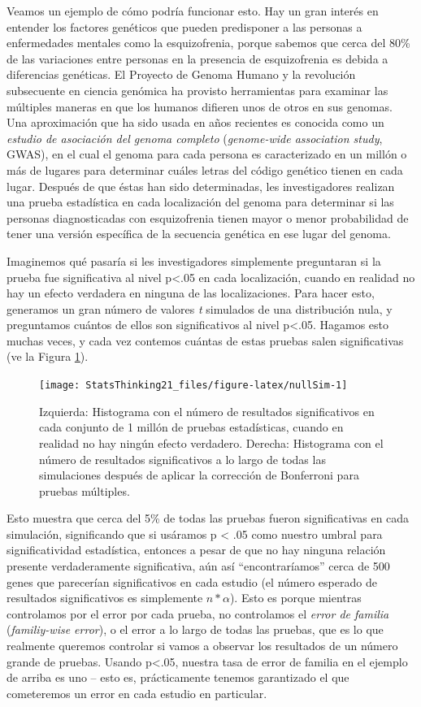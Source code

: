 \documentclass[
  12pt,
]{book}
\theoremstyle{definition}
\theoremstyle{definition}
\theoremstyle{definition}
\theoremstyle{remark}
\begin{document}
Veamos un ejemplo de cómo podría funcionar esto. Hay un gran interés en entender los factores genéticos que pueden predisponer a las personas a enfermedades mentales como la esquizofrenia, porque sabemos que cerca del 80\% de las variaciones entre personas en la presencia de esquizofrenia es debida a diferencias genéticas. El Proyecto de Genoma Humano y la revolución subsecuente en ciencia genómica ha provisto herramientas para examinar las múltiples maneras en que los humanos difieren unos de otros en sus genomas. Una aproximación que ha sido usada en años recientes es conocida como un \emph{estudio de asociación del genoma completo} (\emph{genome-wide association study}, GWAS), en el cual el genoma para cada persona es caracterizado en un millón o más de lugares para determinar cuáles letras del código genético tienen en cada lugar. Después de que éstas han sido determinadas, les investigadores realizan una prueba estadística en cada localización del genoma para determinar si las personas diagnosticadas con esquizofrenia tienen mayor o menor probabilidad de tener una versión específica de la secuencia genética en ese lugar del genoma.

Imaginemos qué pasaría si les investigadores simplemente preguntaran si la prueba fue significativa al nivel p\textless.05 en cada localización, cuando en realidad no hay un efecto verdadera en ninguna de las localizaciones. Para hacer esto, generamos un gran número de valores \emph{t} simulados de una distribución nula, y preguntamos cuántos de ellos son significativos al nivel p\textless.05. Hagamos esto muchas veces, y cada vez contemos cuántas de estas pruebas salen significativas (ve la Figura \ref{fig:nullSim}).

\begin{figure}
\texttt{[image: StatsThinking21\_files/figure-latex/nullSim-1]} \caption{Izquierda: Histograma con el número de resultados significativos en cada conjunto de 1 millón de pruebas estadísticas, cuando en realidad no hay ningún efecto verdadero. Derecha: Histograma con el número de resultados significativos a lo largo de todas las simulaciones después de aplicar la corrección de Bonferroni para pruebas múltiples.}\label{fig:nullSim}
\end{figure}

Esto muestra que cerca del 5\% de todas las pruebas fueron significativas en cada simulación, significando que si usáramos p \textless{} .05 como nuestro umbral para significatividad estadística, entonces a pesar de que no hay ninguna relación presente verdaderamente significativa, aún así ``encontraríamos'' cerca de 500 genes que parecerían significativos en cada estudio (el número esperado de resultados significativos es simplemente \(n * \alpha\)). Esto es porque mientras controlamos por el error por cada prueba, no controlamos el \emph{error de familia} (\emph{familiy-wise error}), o el error a lo largo de todas las pruebas, que es lo que realmente queremos controlar si vamos a observar los resultados de un número grande de pruebas. Usando p\textless.05, nuestra tasa de error de familia en el ejemplo de arriba es uno -- esto es, prácticamente tenemos garantizado el que cometeremos un error en cada estudio en particular.
\end{document}
